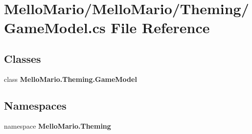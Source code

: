 \section{Mello\+Mario/\+Mello\+Mario/\+Theming/\+Game\+Model.cs File Reference}
\label{GameModel_8cs}
\subsection*{Classes}
\begin{DoxyCompactItemize}
\item 
class \textbf{ Mello\+Mario.\+Theming.\+Game\+Model}
\end{DoxyCompactItemize}
\subsection*{Namespaces}
\begin{DoxyCompactItemize}
\item 
namespace \textbf{ Mello\+Mario.\+Theming}
\end{DoxyCompactItemize}
